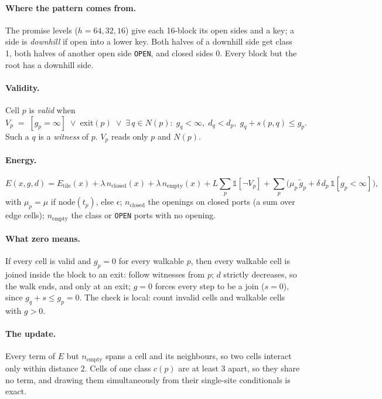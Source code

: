 \documentclass[11pt]{article}
\newcommand{\1}{\mathds{1}}
\begin{document}
\paragraph{Where the pattern comes from.} The promise levels ($h = 64, 32, 16$) give each
16-block its open sides and a key; a side is \emph{downhill} if open into a lower key. Both
halves of a downhill side get class 1, both halves of another open side \texttt{OPEN}, and
closed sides 0. Every block but the root has a downhill side.

\paragraph{Validity.} Cell $p$ is \emph{valid} when
\[
  V_p \;=\; [g_p = \infty] \;\lor\; \mathrm{exit}(p) \;\lor\; \exists\, q \in N(p):\;
  g_q < \infty,\; d_q < d_p,\; g_q + s(p,q) \le g_p .
\]
Such a $q$ is a \emph{witness} of $p$. $V_p$ reads only $p$ and $N(p)$.

\paragraph{Energy.}
\[
  E(x,g,d) = E_{\text{tile}}(x)
  + \lambda\, n_{\text{closed}}(x) + \lambda\, n_{\text{empty}}(x)
  + L \sum_p \1[\lnot V_p]
  + \sum_p \Big( \mu_p\, \tilde g_p + \delta\, d_p\, \1[g_p < \infty] \Big),
\]
with $\mu_p = \mu$ if $\mathrm{node}(t_p)$, else $\epsilon$;
$n_{\text{closed}}$ the openings on closed ports (a sum over edge cells);
$n_{\text{empty}}$ the class or \texttt{OPEN} ports with no opening.

\paragraph{What zero means.} If every cell is valid and $g_p = 0$ for every walkable $p$,
then every walkable cell is joined inside the block to an exit: follow witnesses from $p$;
$d$ strictly decreases, so the walk ends, and only at an exit; $g = 0$ forces every step to
be a join ($s = 0$), since $g_q + s \le g_p = 0$. The check is local: count invalid cells and
walkable cells with $g > 0$.

\paragraph{The update.} Every term of $E$ but $n_{\text{empty}}$ spans a cell and its
neighbours, so two cells interact only within distance 2. Cells of one class $c(p)$ are at
least 3 apart, so they share no term, and drawing them simultaneously from their single-site
conditionals is exact.
\end{document}
